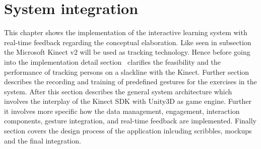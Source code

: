 \chapter{System integration}\label{5_systemIntegration}
This chapter shows the implementation of the interactive learning system with real-time feedback regarding the conceptual elaboration. Like seen in subsection ~\textit{} the Microsoft Kinect v2 will be used as tracking technology. Hence before going into the implementation detail section~\textit{} clarifies the feasibility and the performance of tracking persons on a slackline with the Kinect. Further section \textit{} describes the recording and training of predefined gestures for the exercises in the system. After this section \textit{} describes the general system architecture which involves the interplay of the Kinect SDK with Unity3D as game engine. Further it involves more specific how the data management, engagement, interaction components, gesture integration, and real-time feedback are implemented. Finally section \textit{} covers the design process of the application inlcuding scribbles, mockups and the final integration.





